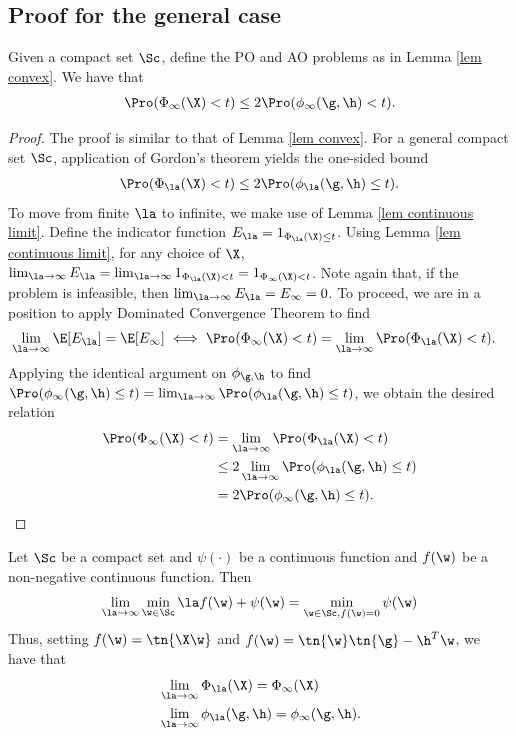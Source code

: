 {\subsection{Proof for the general case}
\begin{lemma} \label{lem general constraint}Given a compact set $\Sc$, define the PO and AO problems as in Lemma \ref{lem convex}. We have that
\begin{align}
\Pro(\Phi_\infty(\X)<t)\leq2\Pro(\phi_\infty(\g,\h)< t).
\end{align}
\end{lemma}
\begin{proof} The proof is similar to that of Lemma \ref{lem convex}. For a general compact set $\Sc$, application of Gordon's theorem yields the one-sided bound
\begin{align}
\Pro(\Phi_\la(\X)<t)\leq2\Pro(\phi_\la(\g,\h)\leq t).
\end{align}
To move from finite $\la$ to infinite, we make use of Lemma \ref{lem continuous limit}. Define the indicator function $E_\la=1_{\Phi_\la(\X)\leq t}$. Using Lemma \ref{lem continuous limit}, for any choice of $\X$, $\lim_{\la\rightarrow\infty}E_\la=\lim_{\la\rightarrow\infty}1_{\Phi_\la(\X)< t}=1_{\Phi_\infty(\X)< t}$. Note again that, if the problem is infeasible, then $\lim_{\la\rightarrow\infty}E_\la=E_\infty=0$. To proceed, we are in a position to apply Dominated Convergence Theorem to find
\begin{align}
&\lim_{\la \rightarrow\infty}\E[E_\la]=\E[E_\infty]\iff\Pro(\Phi_\infty(\X)< t)=\lim_{\la\rightarrow\infty}\Pro(\Phi_\la(\X)< t).
\end{align}
Applying the identical argument on $\phi_{\g,\h}$ to find $\Pro(\phi_\infty(\g,\h)\leq t)=\lim_{\la\rightarrow\infty}\Pro(\phi_\la(\g,\h)\leq t)$, we obtain the desired relation
\begin{align}
\Pro(\Phi_\infty(\X)< t)&=\lim_{\la\rightarrow\infty}\Pro(\Phi_\la(\X)< t)\\
&\leq 2\lim_{\la\rightarrow\infty}\Pro(\phi_\la(\g,\h)\leq t)\\
&= 2\Pro(\phi_\infty(\g,\h)\leq t).
\end{align}
\end{proof}
\begin{lemma}\label{lem continuous limit} Let $\Sc$ be a compact set and $\psi(\cdot)$ be a continuous function and $f(\w)$ be a non-negative continuous function. Then
\[
\lim_{\la\rightarrow\infty}\min_{\w\in\Sc}\la f(\w)+\psi(\w)=\min_{\w\in\Sc,f(\w)=0}\psi(\w)
\]
Thus, setting $f(\w)=\tn{\X\w}$ and $f(\w)=\tn{\w}\tn{\g}-\h^T\w$, we have that
\begin{align*}
&\lim_{\la\rightarrow\infty}\Phi_{\la}(\X)=\Phi_{\infty}(\X)\\
&\lim_{\la\rightarrow\infty}\phi_{\la}(\g,\h)=\phi_{\infty}(\g,\h).
\end{align*}
\end{lemma}}
